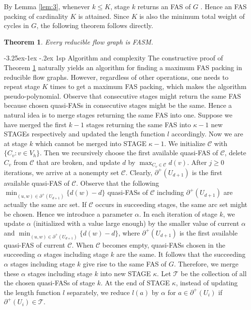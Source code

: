 \documentclass[11pt]{article}
\makeatletter
\newtheorem{theorem}{Theorem}[section]
\renewcommand\subsection{%
  \@startsection{subsection}{2}
                {\z@}%
                {-3.25ex\@plus -1ex \@minus -.2ex}%
                {1sp}%
                {\normalsize\bfseries}%
}
\makeatother
\begin{document}
By Lemma \ref{lem:3}, whenever $k\leq K$, stage $k$ returns an FAS of $G$ . Hence an FAS packing of cardinality $K$ is attained. Since $K$ is also the minimum total weight of cycles in $G$, the following theorem follows directly.

\begin{theorem}
\label{thm:4}
Every reducible flow graph is FASM.
\end{theorem}

\subsection{Algorithm and complexity}
\label{sec:5}
The constructive proof of Theorem \ref{thm:4} naturally yields an algorithm for finding a maximum FAS packing in reducible flow graphs. However, regardless of other operations, one needs to repeat stage $K$ times to get a maximum FAS packing, which makes the algorithm pseudo-polynomial. Observe that consecutive stages might return the same FAS because chosen quasi-FASs in consecutive stages might be the same. Hence a natural idea is to merge stages returning the same FAS into one.  
Suppose we have merged the first $k-1$ stages returning the same FAS into $\kappa-1$ new STAGEs respectively and updated the length function $l$ accordingly. Now we are at stage $k$ which cannot be merged into STAGE $\kappa-1$. We initialize $\mathcal{C}$ with $\{C_v:v\in V_h\}$. Then we recursively choose the first available quasi-FAS of $\mathcal{C}$, delete $C_v$ from $\mathcal{C}$ that are broken, and update $d$ by $\max_{C_v\in\mathcal{C}} d(v)$. After $j\geq 0$ iterations, we arrive at a nonempty set $\mathcal{C}$. Clearly, $\partial^+(U_{d+1})$ is the first available quasi-FAS of $\mathcal{C}$. Observe that the following $\min_{(u,w)\in\partial^+(U_{d+1})}\{d(w)-d\}$ quasi-FASs of $\mathcal{C}$ including $\partial^+(U_{d+1})$ are actually the same arc set. If $\mathcal{C}$ occurs in succeeding stages, the same arc set might be chosen. Hence we introduce a parameter $\alpha$. In each iteration of stage $k$, we update $\alpha$ (initialized with a value large enough) by the smaller value of current $\alpha$ and $\min_{(u,w)\in\partial^+(U_{d+1})}\{d(w)-d\}$, where $\partial^+(U_{d+1})$ is the first available quasi-FAS of current $\mathcal{C}$. When $\mathcal{C}$ becomes empty, quasi-FASs chosen in the succeeding $\alpha$ stages including stage $k$ are the same. It follows that the succeeding $\alpha$ stages including stage $k$ give rise to the same FAS of $G$. Therefore, we merge these $\alpha$ stages including stage $k$ into new STAGE $\kappa$. Let $\mathcal{T}$ be the collection of all the chosen quasi-FASs of stage $k$. At the end of STAGE $\kappa$, instead of updating the length function $l$ separately, we reduce $l(a)$ by $\alpha$ for $a\in \partial^+(U_i)$ if $\partial^+(U_i)\in\mathcal{T}$.
\end{document}
